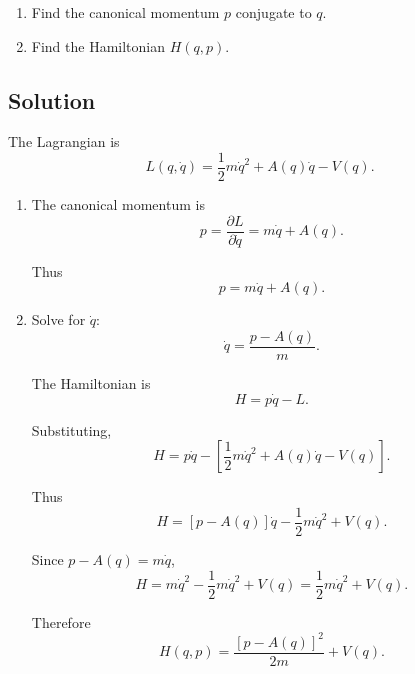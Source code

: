 \documentclass[11pt, a4paper]{article} %
\begin{document}
\begin{enumerate}
\item[(1)] Find the canonical momentum $p$ conjugate to $q$.

\item[(2)] Find the Hamiltonian $H(q,p)$.
\end{enumerate}

\subsection*{Solution}
The Lagrangian is
\[
L(q,\dot q)
=
\frac12 m\dot q^2
+
A(q)\dot q
-
V(q).
\]

\begin{enumerate}
\item[(1)] The canonical momentum is
\[
p=\frac{\partial L}{\partial \dot q}
=
m\dot q+A(q).
\]

Thus
\[
\boxed{
p=m\dot q+A(q).
}
\]

\item[(2)] Solve for \(\dot q\):
\[
\dot q=\frac{p-A(q)}{m}.
\]

The Hamiltonian is
\[
H=p\dot q-L.
\]

Substituting,
\[
H
=
p\dot q
-
\left[
\frac12 m\dot q^2
+
A(q)\dot q
-
V(q)
\right].
\]

Thus
\[
H
=
[p-A(q)]\dot q
-
\frac12 m\dot q^2
+
V(q).
\]

Since \(p-A(q)=m\dot q\),
\[
H
=
m\dot q^2
-
\frac12 m\dot q^2
+
V(q)
=
\frac12 m\dot q^2+V(q).
\]

Therefore
\[
\boxed{
H(q,p)=\frac{[p-A(q)]^2}{2m}+V(q).
}
\]

\end{enumerate}


\newpage
\end{document}
